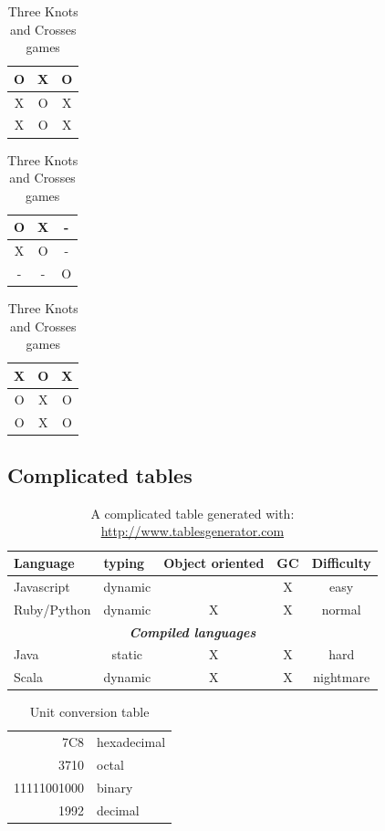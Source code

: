 \begin{table}[H]
	\label{tab:knotsAndCrosses}
	\centering
	\caption[Three Knots and Crosses games]{Three Knots and Crosses games}
	\begin{tabular}{|c | c | c|} %
		\hline
		O & X & O \\\hline
		X & O & X \\\hline
		X & O & X \\\hline 
	\end{tabular}
	\begin{tabular}{|c | c | c|} %
		\hline
		O & X & - \\\hline 	
		X & O & - \\\hline
		- & - & O \\\hline 
	\end{tabular}
	\begin{tabular}{|c | c | c|} %
		\hline
		X & O & X \\\hline 	
		O & X & O \\\hline
		O & X & O \\\hline 
	\end{tabular}
\end{table}


\subsection{Complicated tables}
\begin{table}[H]
	\label{tab:complicatedTable}
	\centering
	\def\arraystretch{1.5} %
	\caption[A complicated table]{A complicated table generated with: \url{http://www.tablesgenerator.com}}
\begin{tabular}{|l|c|c|c|c|}
	\hline
	\textbf{Language} & \multicolumn{1}{l|}{\textbf{typing}} & \multicolumn{1}{l|}{\textbf{Object oriented}} & \multicolumn{1}{l|}{\textbf{GC}} & \multicolumn{1}{l|}{\textbf{Difficulty}} \\ \hline
	Javascript & dynamic &  & X & easy \\ \hline
	Ruby/Python & dynamic & X & X & normal \\ \hline
	\multicolumn{5}{|c|}{\textit{\textbf{Compiled languages}}} \\ \hline
	Java & static & X & X & hard \\ \hline
	Scala & dynamic & X & X & nightmare \\ \hline
\end{tabular}
\end{table}
\begin{table}[H]
	\label{tab:unitConversion}
	\centering
	\caption[Unit conversion table]{Unit conversion table}
	\begin{tabular}{|r|l|}
		\hline
		7C8 & hexadecimal \\
		3710 & octal \\ \cline{2-2}
		11111001000 & binary \\
		\hline \hline
		1992 & decimal \\
		\hline
	\end{tabular}
\end{table}

